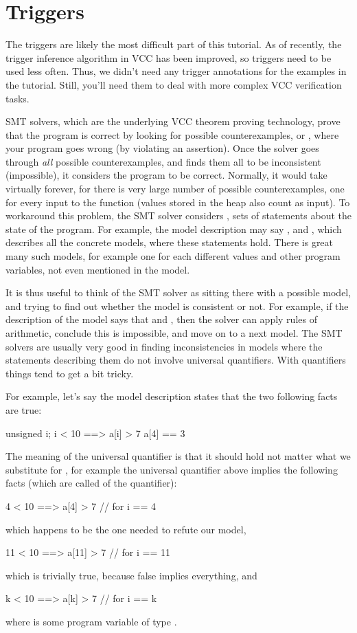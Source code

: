 \section{Triggers}

The triggers are likely the most difficult part of this tutorial.
As of recently, the trigger inference algorithm in VCC
has been improved, so triggers need to be used less often.
Thus, we didn't need any trigger annotations for the examples
in the tutorial.
Still, you'll need them to deal with more complex VCC verification
tasks.

SMT solvers, which are the underlying VCC theorem proving technology,
prove that the program is correct by looking for possible counterexamples,
or , where your program goes wrong (\eg by violating an assertion).
Once the solver goes through \emph{all} possible counterexamples, and finds them
all to be inconsistent (\ie impossible),
it considers the program to be correct.
Normally, it would take virtually forever, for there is very large number of
possible counterexamples, one for every input to the function (values stored in
the heap also count as input).
To workaround this problem, the SMT solver considers
, \ie 
sets of statements about the state of the program.
For example, the model description may say , 
and , which describes all the concrete models, where
these statements hold. There is great many such models,
for example one for each different values  and other program variables,
not even mentioned in the model.

It is thus useful to think of the SMT solver as sitting there with
a possible model, and trying to find out whether the model is consistent or not.
For example, if the description of the model says that  and
, then the solver can apply rules of arithmetic, conclude this is
impossible, and move on to a next model.
The SMT solvers are usually very good in finding inconsistencies in models
where the statements describing them do not involve universal quantifiers.
With quantifiers things tend to get a bit tricky.

For example, let's say the model description states that the two
following facts are true:
\begin{VCC}
\forall unsigned i; i < 10 ==> a[i] > 7
a[4] == 3
\end{VCC}
The meaning of the universal quantifier is that it should hold
not matter what we substitute for , for example
the universal quantifier above implies the following facts (which
are called  of the quantifier):
\begin{VCC}
 4 < 10 ==>  a[4] > 7  // for i == 4
\end{VCC}
which happens to be the one needed to refute our model,
\begin{VCC}
11 < 10 ==> a[11] > 7  // for i == 11
\end{VCC}
which is trivially true, because false implies everything, and
\begin{VCC}
 k < 10 ==>  a[k] > 7  // for i == k
\end{VCC}
where  is some program variable of type .

